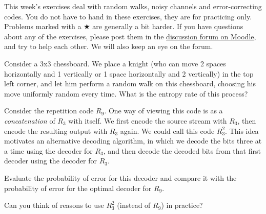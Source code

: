 \documentclass[a4paper,10pt,landscape,twocolumn]{scrartcl}
\begin{document}
\practiceproblems

{\sffamily\noindent
This week's exercises deal with random walks, noisy channels and error-correcting codes. You do not have to hand in these exercises, they are for practicing only. Problems marked with a $\bigstar$ are generally a bit harder. If you have questions about any of the exercises, please post them in the \href{https://www.moodle.ch/lms/mod/forum/view.php?id=2219}{discussion forum on Moodle}, and try to help each other. We will also keep an eye on the forum.
}

\begin{exercise}
Consider a 3x3 chessboard. We place a knight (who can move 2 spaces horizontally and 1 vertically or 1 space horizontally and 2 vertically) in the top left corner, and let him perform a random walk on this chessboard, choosing his move uniformly random every time. What is the entropy rate of this process?
\end{exercise}

\begin{exercise}
Consider the repetition code $R_9$. One way of viewing this code is as a \emph{concatenation} of $R_3$ with itself. We first encode the source stream with $R_3$, then encode the resulting output with $R_3$ again. We could call this code $R_3^2$. This idea motivates an alternative decoding algorithm, in which we decode the bits three at a time using the decoder for $R_3$, and then decode the decoded bits from that first decoder using the decoder for $R_3$.

Evaluate the probability of error for this decoder and compare it with the probability of error for the optimal decoder for $R_9$.

Can you think of reasons to use $R_3^2$ (instead of $R_9$) in practice?
\end{exercise}
\end{document}
